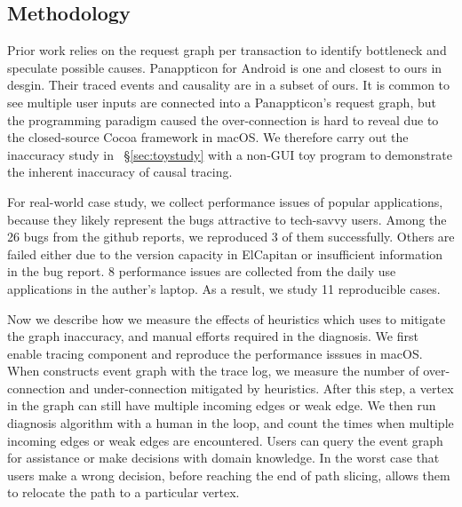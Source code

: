 \subsection{Methodology} \label{sec:methodology}


Prior work relies on the request graph per transaction to identify bottleneck
and speculate possible causes. Panappticon for Android is one and closest to
ours in desgin. Their traced events and causality are in a subset of ours.
It is common to see multiple user inputs are connected into a Panappticon's
request graph, but the programming paradigm caused the over-connection is hard
to reveal due to the closed-source Cocoa framework in macOS. We therefore carry
out the inaccuracy study in ~\S\ref{sec:toystudy} with a non-GUI toy program to
demonstrate the inherent inaccuracy of causal tracing.

For real-world case study, we collect performance issues of popular
applications, because they likely represent the bugs attractive to tech-savvy
users. Among the 26 bugs from the github reports, we reproduced 3 of them
successfully. Others are failed either due to the version capacity in ElCapitan
or insufficient information in the bug report. 8 performance issues are
collected from the daily use applications in the auther's laptop. As a result,
we study 11 reproducible cases. 


Now we describe how we measure the effects of heuristics which \xxx uses to
mitigate the graph inaccuracy, and manual efforts required in the diagnosis. We
first enable tracing component and reproduce the performance isssues in macOS.
When \xxx constructs event graph with the trace log, we measure the number of
over-connection and under-connection mitigated by heuristics. After this step, a
vertex in the graph can still have multiple incoming edges or weak edge. We then
run \xxx diagnosis algorithm with a human in the loop, and count the times when
multiple incoming edges or weak edges are encountered. Users can query the event
graph for assistance or make decisions with domain knowledge. In the worst case
that users make a wrong decision, before reaching the end of path slicing, \xxx
allows them to relocate the path to a particular vertex.

